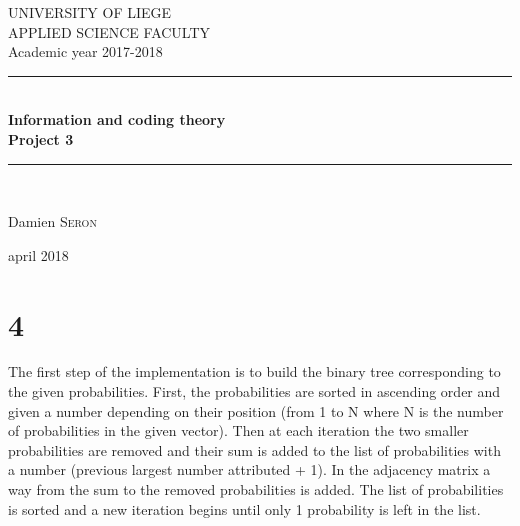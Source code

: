 \documentclass[a4paper,12pt]{article}
\begin{document}

\begin{titlepage}
\begin{center}

\begin{center}
{\large   UNIVERSITY OF LIEGE \\
APPLIED SCIENCE FACULTY \\
Academic year 2017-2018}\\[0.5cm]
   \end{center} 




\vfill\noindent
\rule{\linewidth}{0.5mm} \\[0.4cm]
{ \huge \bfseries Information and coding theory \\ Project 3 \\[0.4cm] }
\rule{\linewidth}{0.5mm} \\[1.5cm]

\noindent
\begin{center}
  \large
    Damien \textsc{Seron}

\end{center}


\vfill

{\large  april 2018}

\end{center}
\end{titlepage}


\section*{4}
The first step of the implementation is to build the binary tree corresponding to the given probabilities. First, the probabilities are sorted in ascending order and given a number depending on their position (from 1 to N where N is the number of probabilities in the given vector). Then at each iteration the two smaller probabilities are removed and their sum is added to the list of probabilities with a number (previous largest number attributed + 1). In the adjacency matrix a way from the sum to the removed probabilities is added. The list of probabilities is sorted and a new iteration begins until only 1 probability is left in the list. 
\end{document}
